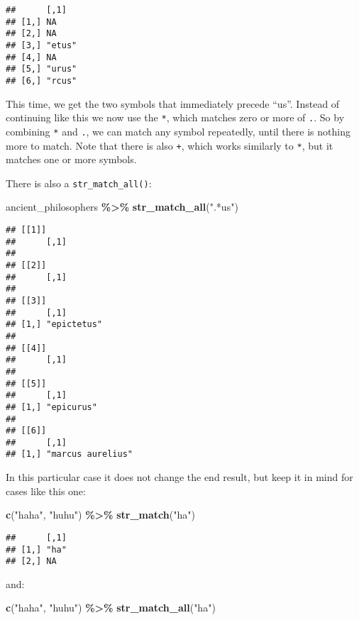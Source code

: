 \documentclass[
]{article}
\newenvironment{Shaded}{\begin{snugshade}}{\end{snugshade}}
\newcommand{\KeywordTok}[1]{\textcolor[rgb]{0.13,0.29,0.53}{\textbf{#1}}}
\newcommand{\NormalTok}[1]{#1}
\newcommand{\OperatorTok}[1]{\textcolor[rgb]{0.81,0.36,0.00}{\textbf{#1}}}
\newcommand{\StringTok}[1]{\textcolor[rgb]{0.31,0.60,0.02}{#1}}
\begin{document}
\begin{verbatim}
##      [,1]  
## [1,] NA    
## [2,] NA    
## [3,] "etus"
## [4,] NA    
## [5,] "urus"
## [6,] "rcus"
\end{verbatim}

This time, we get the two symbols that immediately precede ``us''. Instead of continuing like this
we now use the \texttt{*}, which matches zero or more of \texttt{.}. So by combining \texttt{*} and \texttt{.}, we can match
any symbol repeatedly, until there is nothing more to match. Note that there is also \texttt{+}, which works
similarly to \texttt{*}, but it matches one or more symbols.

There is also a \texttt{str\_match\_all()}:

\begin{Shaded}
\begin{Highlighting}[]
\NormalTok{ancient\_philosophers }\OperatorTok{\%\textgreater{}\%}
\StringTok{  }\KeywordTok{str\_match\_all}\NormalTok{(}\StringTok{".*us"}\NormalTok{)}
\end{Highlighting}
\end{Shaded}

\begin{verbatim}
## [[1]]
##      [,1]
## 
## [[2]]
##      [,1]
## 
## [[3]]
##      [,1]       
## [1,] "epictetus"
## 
## [[4]]
##      [,1]
## 
## [[5]]
##      [,1]      
## [1,] "epicurus"
## 
## [[6]]
##      [,1]             
## [1,] "marcus aurelius"
\end{verbatim}

In this particular case it does not change the end result, but keep it in mind for cases like this one:

\begin{Shaded}
\begin{Highlighting}[]
\KeywordTok{c}\NormalTok{(}\StringTok{"haha"}\NormalTok{, }\StringTok{"huhu"}\NormalTok{) }\OperatorTok{\%\textgreater{}\%}
\StringTok{  }\KeywordTok{str\_match}\NormalTok{(}\StringTok{"ha"}\NormalTok{)}
\end{Highlighting}
\end{Shaded}

\begin{verbatim}
##      [,1]
## [1,] "ha"
## [2,] NA
\end{verbatim}

and:

\begin{Shaded}
\begin{Highlighting}[]
\KeywordTok{c}\NormalTok{(}\StringTok{"haha"}\NormalTok{, }\StringTok{"huhu"}\NormalTok{) }\OperatorTok{\%\textgreater{}\%}
\StringTok{  }\KeywordTok{str\_match\_all}\NormalTok{(}\StringTok{"ha"}\NormalTok{)}
\end{Highlighting}
\end{Shaded}
\end{document}
